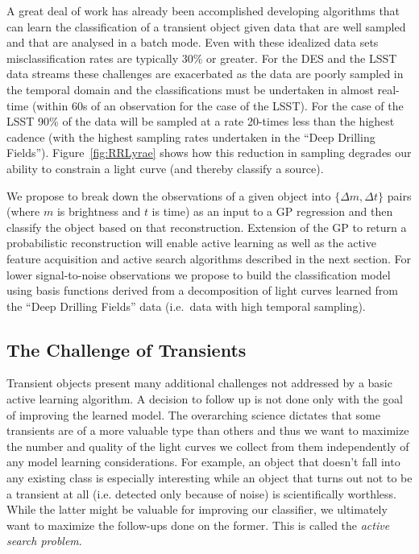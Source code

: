 \documentclass[prd,nofootbib,floatfix,11pt,tightenlines]{revtex4}
\begin{document}
A great deal of work has already been accomplished developing algorithms
that can learn the classification of a transient object given data that are
well sampled and that are analysed in a batch mode. Even with these
idealized data sets misclassification rates are typically 30\% or greater.
For the DES and the LSST data streams these challenges are exacerbated as
the data are poorly sampled in the temporal domain and the classifications
must be undertaken in almost real-time (within 60s of an observation for
the case of the LSST).  For the case of the LSST 90\% of the data will be
sampled at a rate 20-times less than the highest cadence (with the highest
sampling rates undertaken in the ``Deep Drilling Fields'').
Figure~\ref{fig:RRLyrae} shows how this reduction in sampling degrades our
ability to constrain a light curve (and thereby classify a source).

We propose to break down the observations of a given object into $\{\Delta
m,\Delta t\}$ pairs (where $m$ is brightness and $t$ is time) as an input
to a GP regression and then classify the object based on that
reconstruction. Extension of the GP to return a probabilistic
reconstruction will enable active learning as well as the active feature
acquisition and active search algorithms described in the next section. For
lower signal-to-noise observations we propose to build the classification
model using basis functions derived from a decomposition of light curves
learned from the ``Deep Drilling Fields'' data (i.e.\ data with high
temporal sampling).

\subsection{The Challenge of Transients}

Transient objects present many additional challenges not addressed by a
basic active learning algorithm.  A decision to follow up is not done only
with the goal of improving the learned model.  The overarching science
dictates that some transients are of a more valuable type than others and
thus we want to maximize the number and quality of the light curves we
collect from them independently of any model learning considerations.  For
example, an object that doesn't fall into any existing class is especially
interesting while an object that turns out not to be a transient at all
(i.e. detected only because of noise) is scientifically worthless.  While
the latter might be valuable for improving our classifier, we ultimately
want to maximize the follow-ups done on the former.  This is called the
{\em active search problem}.
\end{document}
